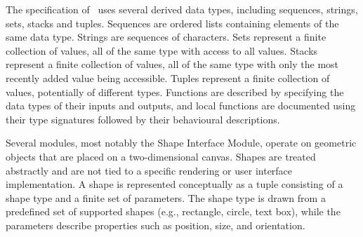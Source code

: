 \documentclass[12pt, titlepage]{article}
\begin{document}
%
%
%

\noindent
The specification of \progname\ uses several derived data types, including
sequences, strings, sets, stacks and tuples. Sequences are ordered lists containing elements
of the same data type. Strings are sequences of characters. 
Sets represent a finite collection of values, all of the same type with access to all values.
Stacks represent a finite collection of values, all of the same type with only the most recently added value being accessible.
Tuples represent a finite collection of values, potentially of different types. Functions are
described by specifying the data types of their inputs and outputs, and local
functions are documented using their type signatures followed by their
behavioural descriptions.

\noindent
Several modules, most notably the Shape Interface Module, operate on geometric
objects that are placed on a two-dimensional canvas. Shapes are treated
abstractly and are not tied to a specific rendering or user interface
implementation. A shape is represented conceptually as a tuple consisting of a
shape type and a finite set of parameters. The shape type is drawn from a
predefined set of supported shapes (e.g., rectangle, circle, text box), while
the parameters describe properties such as position, size, and orientation.
\end{document}

